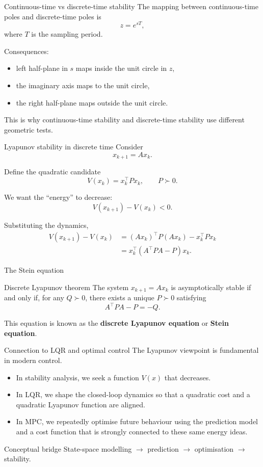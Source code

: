 \documentclass[aspectratio=169,10pt]{beamer}
\newcommand{\T}{^\top}
\begin{document}
\begin{frame}{Continuous-time vs discrete-time stability}
The mapping between continuous-time poles and discrete-time poles is
\[
z=e^{sT},
\]
where \(T\) is the sampling period.

Consequences:
\begin{itemize}
  \item left half-plane in \(s\) maps inside the unit circle in \(z\),
  \item the imaginary axis maps to the unit circle,
  \item the right half-plane maps outside the unit circle.
\end{itemize}

This is why continuous-time stability and discrete-time stability use different geometric tests.
\end{frame}

\begin{frame}{Lyapunov stability in discrete time}
Consider
\[
x_{k+1}=Ax_k.
\]

Define the quadratic candidate
\[
V(x_k)=x_k\T P x_k,
\qquad P\succ 0.
\]

We want the ``energy'' to decrease:
\[
V(x_{k+1})-V(x_k)<0.
\]

Substituting the dynamics,
\begin{align*}
V(x_{k+1})-V(x_k)
&=(Ax_k)\T P(Ax_k)-x_k\T Px_k\\
&=x_k\T (A\T P A - P)x_k.
\end{align*}
\end{frame}

\begin{frame}{The Stein equation}
\begin{alertbox}{Discrete Lyapunov theorem}
The system \(x_{k+1}=Ax_k\) is asymptotically stable if and only if, for any \(Q\succ 0\), there exists a unique \(P\succ 0\) satisfying
\[
A\T P A - P = -Q.
\]
\end{alertbox}

This equation is known as the \textbf{discrete Lyapunov equation} or \textbf{Stein equation}.
\end{frame}

\begin{frame}{Connection to LQR and optimal control}
The Lyapunov viewpoint is fundamental in modern control.

\begin{itemize}
  \item In stability analysis, we seek a function \(V(x)\) that decreases.
  \item In LQR, we shape the closed-loop dynamics so that a quadratic cost and a quadratic Lyapunov function are aligned.
  \item In MPC, we repeatedly optimise future behaviour using the prediction model and a cost function that is strongly connected to these same energy ideas.
\end{itemize}

\begin{notebox}{Conceptual bridge}
State-space modelling \(\rightarrow\) prediction \(\rightarrow\) optimisation \(\rightarrow\) stability.
\end{notebox}
\end{frame}
\end{document}
